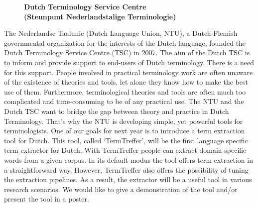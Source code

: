\documentclass[10pt, a4paper, twopage, headinclude, footinclude, BCOR5mm]{book}
\begin{document}
\newpage

\begin{figure}[t!]
\centering
\large\textbf{Dutch Terminology Service Centre \\ (Steunpunt Nederlandstalige Terminologie)}
\vspace*{0.5cm}
\end{figure}


\begin{table}[t!]
\end{table} 
\noindent
The Nederlandse Taalunie (Dutch Language Union, NTU), a Dutch-Flemish governmental organization for the interests of the Dutch language, founded the Dutch Terminology Service Centre (TSC) in 2007. The aim of the Dutch TSC is to inform and provide support to end-users of Dutch terminology.  There is a need for this support. People involved in practical terminology work are often unaware of the existence of theories and tools, let alone they know how to make the best use of them. Furthermore, terminological theories and tools are often much too complicated and time-consuming to be of any practical use.   The NTU and the Dutch TSC want to bridge the gap between theory and practice in Dutch Terminology. That’s why the NTU is developing simple, yet powerful tools for terminologists. One of our goals for next year is to introduce a term extraction tool for Dutch. This tool, called ‘TermTreffer’, will be the first language specific term extractor for Dutch. With TermTreffer people can extract domain specific words from a given corpus. In its default modus the tool offers term extraction in a straightforward way. However, TermTreffer also offers the possibility of tuning the extraction pipelines. As a result, the extractor will be a useful tool in various research scenarios. We would like to give a demonstration of the tool and/or present the tool in a poster.  
\end{document}
